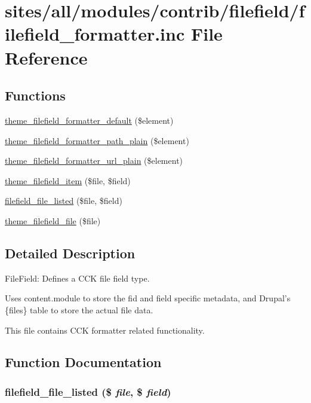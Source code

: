 \hypertarget{filefield__formatter_8inc}{
\section{sites/all/modules/contrib/filefield/filefield\_\-formatter.inc File Reference}
\label{filefield__formatter_8inc}
}
\subsection*{Functions}
\begin{CompactItemize}
\item 
\hyperlink{filefield__formatter_8inc_b9986ffee43634c7091d4b78e6b3b186}{theme\_\-filefield\_\-formatter\_\-default} (\$element)
\item 
\hyperlink{filefield__formatter_8inc_cbb156ec87a8a950a49e4a83ffd0aadd}{theme\_\-filefield\_\-formatter\_\-path\_\-plain} (\$element)
\item 
\hyperlink{filefield__formatter_8inc_c506f82b18a61d6682fec927a2817c79}{theme\_\-filefield\_\-formatter\_\-url\_\-plain} (\$element)
\item 
\hyperlink{filefield__formatter_8inc_fb466d739eaf8509ae22ad7a025a7edb}{theme\_\-filefield\_\-item} (\$file, \$field)
\item 
\hyperlink{filefield__formatter_8inc_86b701c2c901e218ec21cfbbd3569d2c}{filefield\_\-file\_\-listed} (\$file, \$field)
\item 
\hyperlink{filefield__formatter_8inc_2a9bf3e344a51bd3b44f2cc65bd7078c}{theme\_\-filefield\_\-file} (\$file)
\end{CompactItemize}


\subsection{Detailed Description}
FileField: Defines a CCK file field type.

Uses content.module to store the fid and field specific metadata, and Drupal's \{files\} table to store the actual file data.

This file contains CCK formatter related functionality. 

\subsection{Function Documentation}
\hypertarget{filefield__formatter_8inc_86b701c2c901e218ec21cfbbd3569d2c}{
\subsubsection[{filefield\_\-file\_\-listed}]{\setlength{\rightskip}{0pt plus 5cm}filefield\_\-file\_\-listed (\$ {\em file}, \/  \$ {\em field})}}
\label{filefield__formatter_8inc_86b701c2c901e218ec21cfbbd3569d2c}


